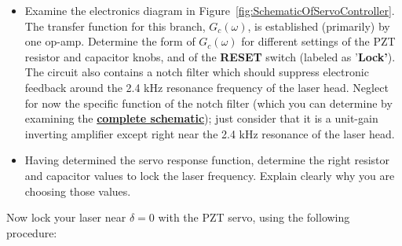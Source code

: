 \documentclass{../lab}
\begin{document}
\begin{itemize}
    \item Examine the electronics diagram in Figure~\ref{fig:SchematicOfServoController}. The transfer function for this branch, $G_c(\omega)$, is established (primarily) by one op-amp. Determine the form of $G_c(\omega)$ for different settings of the PZT resistor and capacitor knobs, and of the \textbf{RESET} switch (labeled as '\textbf{Lock'}). The circuit also contains a notch filter which should suppress electronic feedback around the 2.4 kHz resonance frequency of the laser head. Neglect for now the specific function of the notch filter (which you can determine by examining the \href{http://experimentationlab.berkeley.edu/sites/default/files/images/Full\_schematic.pdf}{\textbf{complete schematic}}); just consider that it is a unit-gain inverting amplifier except right near the 2.4 kHz resonance of the laser head.

    \item Having determined the servo response function, determine the right resistor and capacitor values to lock the laser frequency. Explain clearly why you are choosing those values.
\end{itemize}

Now lock your laser near $\delta = 0$ with the PZT servo, using the following procedure:
\end{document}
